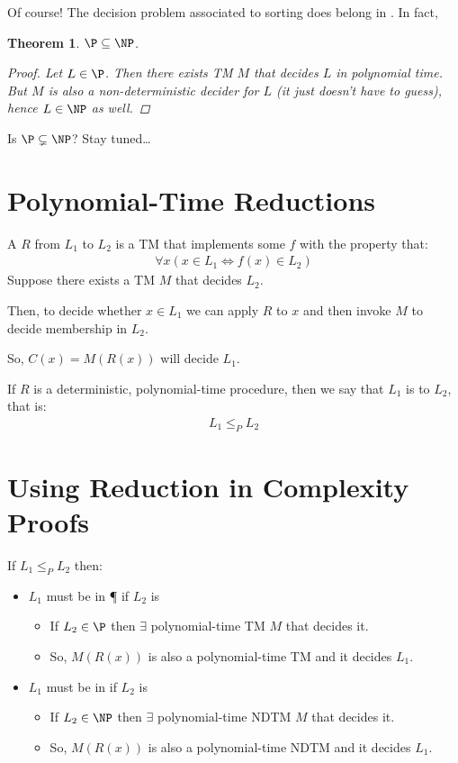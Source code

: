 \documentclass[a4paper]{report}
\newtheorem{theo}{Theorem}
\newcommand{\bookref}[3]{\marginpar{\faBook{}~#1\\Chapter #2\\Section #3}}
\theoremstyle{definition}
\begin{document}
Of course! The decision problem associated to sorting does belong in \NP. In fact,

\begin{theo}
$\P \subseteq \NP$.
\begin{proof}
Let $L \in \P$. Then there exists TM $M$ that decides $L$ in polynomial time. But $M$ is also a non-deterministic decider for $L$ (it just doesn't have to guess), hence $L \in \NP$ as well.
\end{proof}
\end{theo}

Is $\P \subsetneq \NP$? Stay tuned\dots{}

\section{Polynomial-Time Reductions}
\bookref{ER}{28}{28.4}
A  $R$ from $L_1$ to $L_2$ is a TM that implements some  $f$ with the property that:
%
\begin{align*}
\forall x (x \in L_1 \Leftrightarrow f(x) \in L_2)
\end{align*}
%
Suppose there exists a TM $M$ that decides $L_2$.

Then, to decide whether $x \in L_1$ we can apply $R$ to $x$ and then invoke $M$ to decide membership in $L_2$.

So, $C(x) = M(R(x))$ will decide $L_1$.

If $R$ is a deterministic, polynomial-time procedure, then we say that $L_1$ is  to $L_2$, that is:
\begin{align*}
L_1 \leq_{P} L_2
\end{align*}

\section{Using Reduction in Complexity Proofs}
\bookref{ER}{28}{28.4}
If $L_1 \leq_{P} L_2$ then:
\begin{itemize}
\item $L_1$ must be in \P{} if $L_2$ is
\begin{itemize}
\item If $L_2 \in \P$ then $\exists$ polynomial-time TM $M$ that decides it.
\item So, $M(R(x))$ is also a polynomial-time TM and it decides $L_1$.
\end{itemize}
\item $L_1$ must be in \NP{} if $L_2$ is
\begin{itemize}
\item If $L_2 \in \NP$ then $\exists$ polynomial-time NDTM $M$ that decides it.
\item So, $M(R(x))$ is also a polynomial-time NDTM and it decides $L_1$.
\end{itemize}
\end{itemize}
\end{document}
